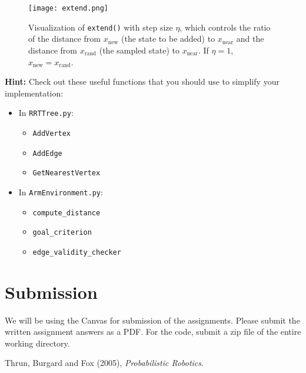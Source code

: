 \documentclass{article}
\begin{document}
\begin{figure}[h]
    \centering
    \texttt{[image: extend.png]}
    \caption{Visualization of \texttt{extend()} with step size $\eta$, which controls the ratio of the distance from $x_{\text{new}}$ (the state to be added) to $x_{\text{near}}$ and the distance from $x_{\text{rand}}$ (the sampled state) to $x_{\text{near}}$. If $\eta=1$, $x_{\text{new}}=x_{\text{rand}}$.}
    \label{fig:extend}
\end{figure}

\textbf{Hint:}
Check out these useful functions that you should use to simplify your implementation:
\begin{itemize}
    \item In \texttt{RRTTree.py}:
    \begin{itemize}
        \item \texttt{AddVertex}
        \item \texttt{AddEdge}
        \item \texttt{GetNearestVertex}
    \end{itemize}
    \item In \texttt{ArmEnvironment.py}:
    \begin{itemize}
        \item \texttt{compute\_distance}
        \item \texttt{goal\_criterion}
        \item \texttt{edge\_validity\_checker}
    \end{itemize}
\end{itemize}

\section{Submission}
We will be using the Canvas for submission of the assignments. Please submit the written assignment answers as a PDF. For the code, submit a zip file of the entire working directory.

\begin{thebibliography}{9}
Thrun, Burgard and Fox (2005), \textit{Probabilistic Robotics}.
\end{thebibliography}
\end{document}
